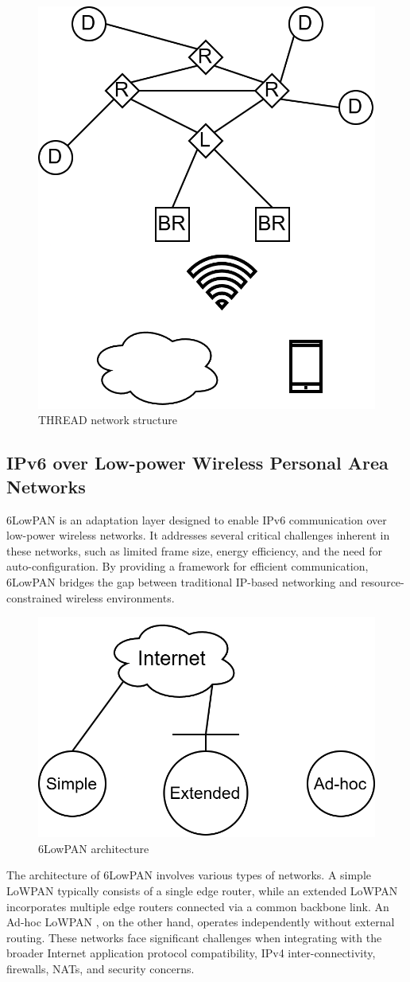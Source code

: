 \begin{figure}[H]
    \centering
    \includegraphics[width=0.35\linewidth]{images/iot17.png}
    \caption{THREAD network structure}
\end{figure}

\subsection{IPv6 over Low-power Wireless Personal Area Networks}
6LowPAN is an adaptation layer designed to enable IPv6 communication over low-power wireless networks. 
It addresses several critical challenges inherent in these networks, such as limited frame size, energy efficiency, and the need for auto-configuration. 
By providing a framework for efficient communication, 6LowPAN bridges the gap between traditional IP-based networking and resource-constrained wireless environments.

\begin{figure}[H]
    \centering
    \includegraphics[width=0.5\linewidth]{images/iot18.png}
    \caption{6LowPAN architecture}
\end{figure}
The architecture of 6LowPAN involves various types of networks. 
A simple LoWPAN typically consists of a single edge router, while an extended LoWPAN incorporates multiple edge routers connected via a common backbone link. 
An Ad-hoc LoWPAN , on the other hand, operates independently without external routing. 
These networks face significant challenges when integrating with the broader Internet application protocol compatibility, IPv4 inter-connectivity, firewalls, NATs, and security concerns.

